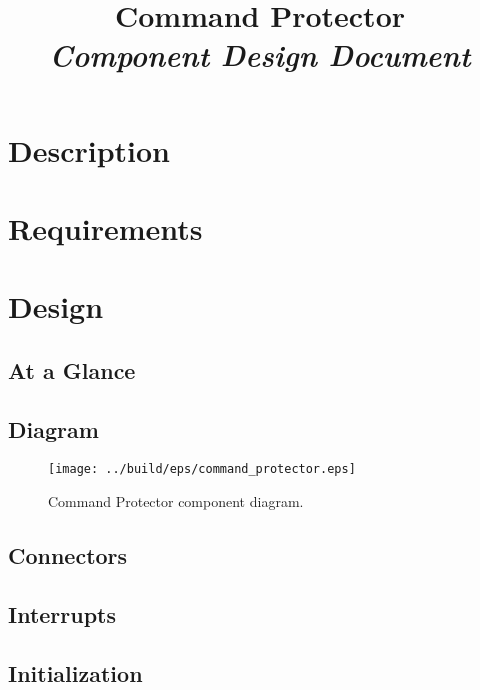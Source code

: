 



\title{\textbf{Command Protector} \\
\large\textit{Component Design Document}}
\date{}
\maketitle

\section{Description}


\section{Requirements}


\section{Design}

\subsection{At a Glance}


\subsection{Diagram}
\begin{figure}[H]
  \texttt{[image: ../build/eps/command\_protector.eps]}
  \caption{Command Protector component diagram.}
\end{figure}

\subsection{Connectors}


\subsection{Interrupts}



\subsection{Initialization}


